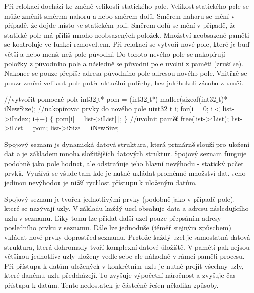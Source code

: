 Při relokaci dochází ke změně velikosti statického pole. Velikost statického pole se může změnit směrem nahoru a nebo směrem dolů. Směrem nahoru se mění v případě, že dojde místo ve statickém poli. Směrem dolů se mění v případě, že statické pole má příliš mnoho neobsazených položek. Množství neobsazené paměti se kontroluje ve funkci removeItem. Při relokaci se vytvoří nové pole, které je buď větší a nebo menší než pole původní. Do tohoto nového pole se nakopírují položky z původního pole a následně se původní pole uvolní z paměti (zruší se). Nakonec se pouze přepíše adresa původního pole adresou nového pole. Vnitřně se pouze změní velikost pole potře aktuální potřeby, bez jakéhokoli zásahu z venčí. 

\vskip 4mm
{
\verbatim
\odradkovat
//vytvořit pomocné pole\odradkovat
int32$\_$t* pom = (int32$\_$t*) malloc(sizeof(int32$\_$t)* iNewSize);\odradkovat
//nakopírovat prvky do nového pole\odradkovat
uint32$\_$t i;\odradkovat
for(i = 0; i < list->iIndex; i++)\odradkovat
$\{$\odradkovat
\hskip 4mm pom[i] = list->iList[i];\odradkovat
$\}$\odradkovat
//uvolnit paměť\odradkovat
free(list->iList);\odradkovat
list->iList = pom;\odradkovat 
list->iSize = iNewSize;\odradkovat
}
\vskip 4mm 



Spojový seznam je dynamická datová struktura, která primárně slouží pro uložení dat a je základem mnoha složitějších datových struktur. Spojový seznam funguje podobně jako pole hodnot, ale odstraňuje jeho hlavní nevýhodu - statický počet prvků. Využívá se všude tam kde je nutné ukládat proměnné množství dat. Jeho jedinou nevýhodou je nižší rychlost přístupu k uloženým datům. 


Spojový seznam je tvořen jednotlivými prvky (podobně jako v případě pole), které se nazývají uzly. V základu každý uzel obsahuje data a adresu následujícího uzlu v seznamu. Díky tomu lze přidat další uzel pouze přepsáním adresy posledního prvku v seznamu. Dále lze jednoduše (téměř stejným způsobem) vkládat nové prvky doprostřed seznamu. Protože každý uzel je samostatná datová struktura, která dohromady tvoří komplexní datové úložiště.  V paměti pak nejsou většinou jednotlivé uzly uloženy vedle sebe ale náhodně v rámci paměti procesu. Při přístupu k datům uložených v konkrétním uzlu je nutné projít všechny uzly, které danému uzlu předcházejí. To zvyšuje výpočetní náročnost a zvyšuje čas přístupu k datům. Tento nedostatek je částečně řešen několika způsoby. 

